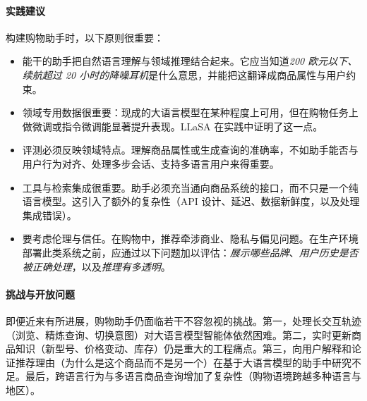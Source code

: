 \paragraph{实践建议}
构建购物助手时，以下原则很重要：
\begin{itemize}
  \item 能干的助手把自然语言理解与领域推理结合起来。它应当知道{\em 200 欧元以下、续航超过 20 小时的降噪耳机}是什么意思，并能把这翻译成商品属性与用户约束。
  \item 领域专用数据很重要：现成的大语言模型在某种程度上可用，但在购物任务上做微调或指令微调能显著提升表现。LLaSA \citep{zhang2024llasa} 在实践中证明了这一点。
  \item 评测必须反映领域特点。理解商品属性或生成查询的准确率，不如助手能否与用户行为对齐、处理多步会话、支持多语言用户来得重要。
  \item 工具与检索集成很重要。助手必须充当通向商品系统的接口，而不只是一个纯语言模型。这引入了额外的复杂性（API 设计、延迟、数据新鲜度，以及处理集成错误）。
  \item 要考虑伦理与信任。在购物中，推荐牵涉商业、隐私与偏见问题。在生产环境部署此类系统之前，应通过以下问题加以评估：{\em 展示哪些品牌}、{\em 用户历史是否被正确处理}，以及{\em 推理有多透明}。
\end{itemize}

\paragraph{挑战与开放问题}
即便近来有所进展，购物助手仍面临若干不容忽视的挑战。第一，处理长交互轨迹（浏览、精炼查询、切换意图）对大语言模型智能体依然困难。第二，实时更新商品知识（新型号、价格变动、库存）仍是重大的工程痛点。第三，向用户解释和论证推荐理由（为什么是这个商品而不是另一个）在基于大语言模型的助手中研究不足。最后，跨语言行为与多语言商品查询增加了复杂性（购物语境跨越多种语言与地区）。





